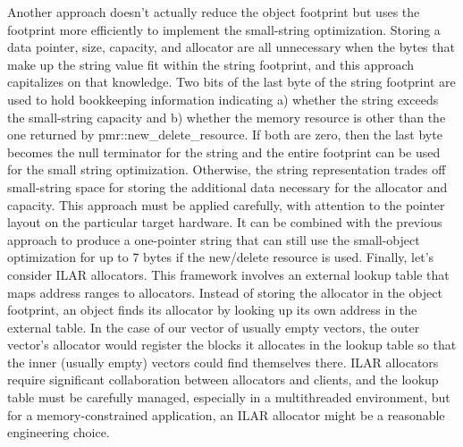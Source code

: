 {{{{{{{{Another approach  doesn’t actually reduce the object footprint but uses the footprint more efficiently to implement the small-string optimization. Storing a data pointer, size, capacity, and allocator are all unnecessary when the bytes that make up the string value fit within the string footprint, and this approach capitalizes on that knowledge. Two bits of the last byte of the string footprint are used to hold bookkeeping information indicating a) whether the string exceeds the small-string capacity and b) whether the memory resource is other than the one returned by pmr::new_delete_resource. If both are zero, then the last byte becomes the null terminator for the string and the entire footprint can be used for the small string optimization. Otherwise, the string representation trades off small-string space for storing the additional data necessary for the allocator and capacity. This approach must be applied carefully, with attention to the pointer layout on the particular target hardware. It can be combined with the previous approach to produce a one-pointer string that can still use the small-object optimization for up to 7 bytes if the new/delete resource is used.
Finally, let’s consider ILAR allocators.  This framework involves an external lookup table that maps address ranges to allocators. Instead of storing the allocator in the object footprint, an object finds its allocator by looking up its own address in the external table. In the case of our vector of usually empty vectors, the outer vector’s allocator would register the blocks it allocates in the lookup table so that the inner (usually empty) vectors could find themselves there. ILAR allocators require significant collaboration between allocators and clients, and the lookup table must be carefully managed, especially in a multithreaded environment, but for a memory-constrained application, an ILAR allocator might be a reasonable engineering choice.

}}}}}}}}
